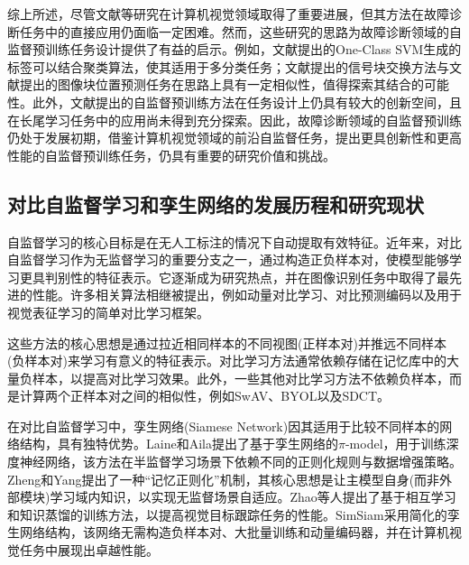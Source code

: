 \documentclass[master]{thesis-uestc}
\begin{document}
综上所述，尽管文献\cite{doersch2015unsupervised, zhang2016colorful, gidaris2018unsupervised}等研究在计算机视觉领域取得了重要进展，但其方法在故障诊断任务中的直接应用仍面临一定困难。然而，这些研究的思路为故障诊断领域的自监督预训练任务设计提供了有益的启示。例如，文献\cite{senanayaka2020toward}提出的One-Class SVM生成的标签可以结合聚类算法，使其适用于多分类任务；文献\cite{zhang2021federated}提出的信号块交换方法与文献\cite{doersch2015unsupervised}提出的图像块位置预测任务在思路上具有一定相似性，值得探索其结合的可能性。此外，文献\cite{zhang2022prior, senanayaka2020toward, zhang2021federated}提出的自监督预训练方法在任务设计上仍具有较大的创新空间，且在长尾学习任务中的应用尚未得到充分探索。因此，故障诊断领域的自监督预训练仍处于发展初期，借鉴计算机视觉领域的前沿自监督任务，提出更具创新性和更高性能的自监督预训练任务，仍具有重要的研究价值和挑战。
\FloatBarrier  %

\subsection{对比自监督学习和孪生网络的发展历程和研究现状}

自监督学习的核心目标是在无人工标注的情况下自动提取有效特征。近年来，对比自监督学习作为无监督学习的重要分支之一，通过构造正负样本对，使模型能够学习更具判别性的特征表示。它逐渐成为研究热点，并在图像识别任务中取得了最先进的性能。许多相关算法相继被提出，例如动量对比学习、对比预测编码以及用于视觉表征学习的简单对比学习框架。

这些方法的核心思想是通过拉近相同样本的不同视图(正样本对)并推远不同样本(负样本对)来学习有意义的特征表示。对比学习方法通常依赖存储在记忆库中的大量负样本，以提高对比学习效果。此外，一些其他对比学习方法不依赖负样本，而是计算两个正样本对之间的相似性，例如SwAV、BYOL以及SDCT。

在对比自监督学习中，孪生网络(Siamese Network)因其适用于比较不同样本的网络结构，具有独特优势。Laine和Aila提出了基于孪生网络的$\pi$-model，用于训练深度神经网络，该方法在半监督学习场景下依赖不同的正则化规则与数据增强策略。Zheng和Yang提出了一种“记忆正则化”机制，其核心思想是让主模型自身(而非外部模块)学习域内知识，以实现无监督场景自适应。Zhao等人提出了基于相互学习和知识蒸馏的训练方法，以提高视觉目标跟踪任务的性能。SimSiam采用简化的孪生网络结构，该网络无需构造负样本对、大批量训练和动量编码器，并在计算机视觉任务中展现出卓越性能。
\end{document}
